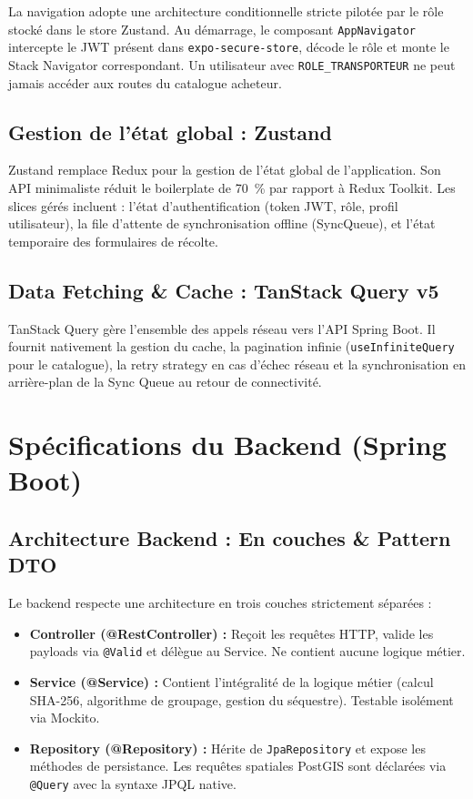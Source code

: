 \documentclass[12pt,a4paper]{report}
\begin{document}
La navigation adopte une architecture conditionnelle stricte pilotée par le rôle stocké dans le store Zustand. Au démarrage, le composant \texttt{AppNavigator} intercepte le JWT présent dans \texttt{expo-secure-store}, décode le rôle et monte le Stack Navigator correspondant. Un utilisateur avec \texttt{ROLE\_TRANSPORTEUR} ne peut jamais accéder aux routes du catalogue acheteur.

\subsection{Gestion de l'état global : Zustand}

Zustand remplace Redux pour la gestion de l'état global de l'application. Son API minimaliste réduit le boilerplate de 70~\% par rapport à Redux Toolkit. Les slices gérés incluent : l'état d'authentification (token JWT, rôle, profil utilisateur), la file d'attente de synchronisation offline (SyncQueue), et l'état temporaire des formulaires de récolte.

\subsection{Data Fetching \& Cache : TanStack Query v5}

TanStack Query gère l'ensemble des appels réseau vers l'API Spring Boot. Il fournit nativement la gestion du cache, la pagination infinie (\texttt{useInfiniteQuery} pour le catalogue), la retry strategy en cas d'échec réseau et la synchronisation en arrière-plan de la Sync Queue au retour de connectivité.

\section{Spécifications du Backend (Spring Boot)}

\subsection{Architecture Backend : En couches \& Pattern DTO}

Le backend respecte une architecture en trois couches strictement séparées :

\begin{itemize}
  \item \textbf{Controller (@RestController) :} Reçoit les requêtes HTTP, valide les payloads via \texttt{@Valid} et délègue au Service. Ne contient aucune logique métier.
  \item \textbf{Service (@Service) :} Contient l'intégralité de la logique métier (calcul SHA-256, algorithme de groupage, gestion du séquestre). Testable isolément via Mockito.
  \item \textbf{Repository (@Repository) :} Hérite de \texttt{JpaRepository} et expose les méthodes de persistance. Les requêtes spatiales PostGIS sont déclarées via \texttt{@Query} avec la syntaxe JPQL native.
\end{itemize}
\end{document}
